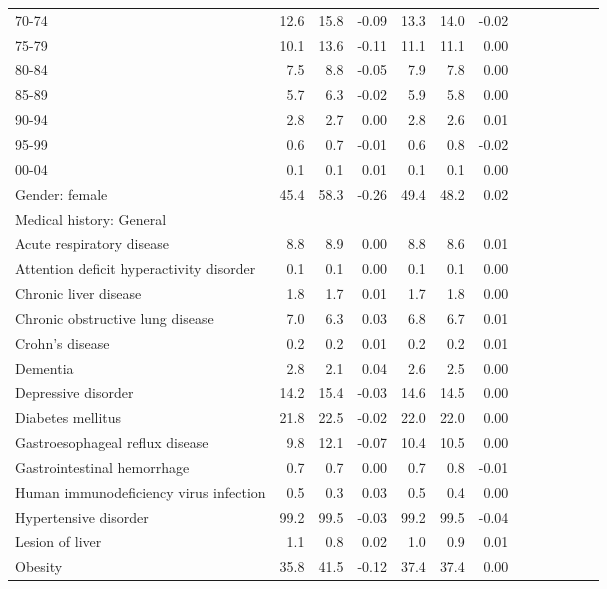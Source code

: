 \documentclass[11pt,]{article}
\begin{document}
\begin{longtable}{lrrrrrrrrrrrr}
      70-74 & 12.6 &  15.8 & -0.09 & 13.3 &  14.0 & -0.02 \\ 
      75-79 & 10.1 &  13.6 & -0.11 & 11.1 &  11.1 &  0.00 \\ 
      80-84 &  7.5 &   8.8 & -0.05 &  7.9 &   7.8 &  0.00 \\ 
      85-89 &  5.7 &   6.3 & -0.02 &  5.9 &   5.8 &  0.00 \\ 
      90-94 &  2.8 &   2.7 &  0.00 &  2.8 &   2.6 &  0.01 \\ 
      95-99 &  0.6 &   0.7 & -0.01 &  0.6 &   0.8 & -0.02 \\ 
      00-04 &  0.1 &   0.1 &  0.01 &  0.1 &   0.1 &  0.00 \\ 
  Gender: female & 45.4 &  58.3 & -0.26 & 49.4 &  48.2 &  0.02 \\ 
  Medical history: General &    &     &     &    &     &     \\ 
      Acute respiratory disease &  8.8 &   8.9 &  0.00 &  8.8 &   8.6 &  0.01 \\ 
      Attention deficit hyperactivity disorder &  0.1 &   0.1 &  0.00 &  0.1 &   0.1 &  0.00 \\ 
      Chronic liver disease &  1.8 &   1.7 &  0.01 &  1.7 &   1.8 &  0.00 \\ 
      Chronic obstructive lung disease &  7.0 &   6.3 &  0.03 &  6.8 &   6.7 &  0.01 \\ 
      Crohn's disease &  0.2 &   0.2 &  0.01 &  0.2 &   0.2 &  0.01 \\ 
      Dementia &  2.8 &   2.1 &  0.04 &  2.6 &   2.5 &  0.00 \\ 
      Depressive disorder & 14.2 &  15.4 & -0.03 & 14.6 &  14.5 &  0.00 \\ 
      Diabetes mellitus & 21.8 &  22.5 & -0.02 & 22.0 &  22.0 &  0.00 \\ 
      Gastroesophageal reflux disease &  9.8 &  12.1 & -0.07 & 10.4 &  10.5 &  0.00 \\ 
      Gastrointestinal hemorrhage &  0.7 &   0.7 &  0.00 &  0.7 &   0.8 & -0.01 \\ 
      Human immunodeficiency virus infection &  0.5 &   0.3 &  0.03 &  0.5 &   0.4 &  0.00 \\ 
      Hypertensive disorder & 99.2 &  99.5 & -0.03 & 99.2 &  99.5 & -0.04 \\ 
      Lesion of liver &  1.1 &   0.8 &  0.02 &  1.0 &   0.9 &  0.01 \\ 
      Obesity & 35.8 &  41.5 & -0.12 & 37.4 &  37.4 &  0.00 \\ 

\end{longtable}
\end{document}

